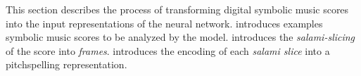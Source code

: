 

This section describes the process of transforming digital symbolic music scores into the input representations of the neural network.  introduces examples symbolic music scores to be analyzed by the model.  introduces the \emph{salami-slicing} of the score into \emph{frames}.  introduces the encoding of each \emph{salami slice} into a \gls{pitchspelling} representation.

